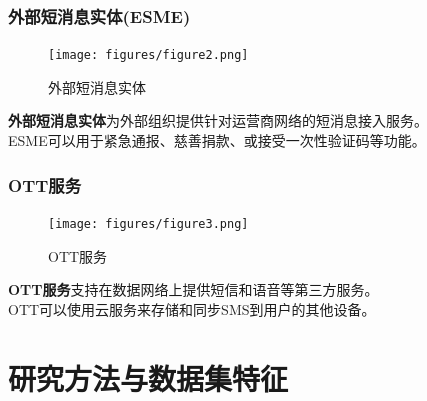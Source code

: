 \documentclass[10pt,aspectratio=43,mathserif]{beamer}
\begin{document}
\begin{frame}
    \frametitle{\textbf{外部短消息实体(ESME)}}
    \begin{figure}[!t]
        \centering
        \texttt{[image: figures/figure2.png]}
        \caption{外部短消息实体}
        \label{figure2_ESME}
    \end{figure}
    \textbf{外部短消息实体}为外部组织提供针对运营商网络的短消息接入服务。\\
    ESME可以用于紧急通报、慈善捐款、或接受一次性验证码等功能。
\end{frame}

\begin{frame}
    \frametitle{\textbf{OTT服务}}
    \begin{figure}[!t]
        \centering
        \texttt{[image: figures/figure3.png]}
        \caption{OTT服务}
        \label{figure3_OTT}
    \end{figure}
    \textbf{OTT服务}支持在数据网络上提供短信和语音等第三方服务。\\
    OTT可以使用云服务来存储和同步SMS到用户的其他设备。
\end{frame}


\section[方法]{研究方法与数据集特征}
\end{document}
